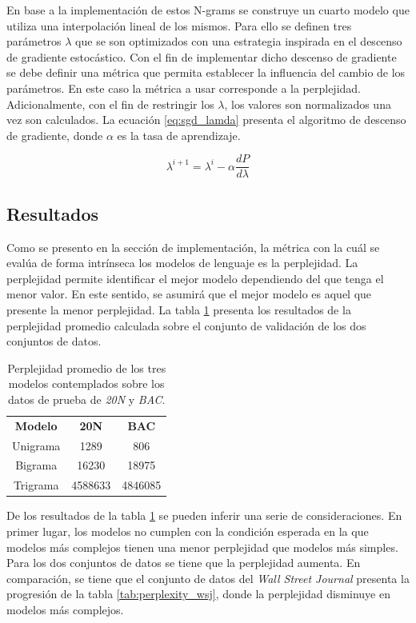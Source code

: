 En base a la implementación de estos N-grams se construye un cuarto modelo que utiliza una interpolación lineal de los mismos. Para ello se definen tres parámetros $\lambda$ que se son optimizados con una estrategia inspirada en el descenso de gradiente estocástico. Con el fin de implementar dicho descenso de gradiente se debe definir una métrica que permita establecer la influencia del cambio de los parámetros. En este caso la métrica a usar corresponde a la perplejidad. Adicionalmente, con el fin de restringir los $\lambda$, los valores son normalizados una vez son calculados. La ecuación \ref{eq:sgd_lamda} presenta el algoritmo de descenso de gradiente, donde $\alpha$ es la tasa de aprendizaje.

\begin{equation}
    \lambda^{i+1} = \lambda^{i} - \alpha \frac{dP}{d\lambda}
    \label{eq:sgd_lamda}
\end{equation}

\subsection{Resultados}
Como se presento en la sección de implementación, la métrica con la cuál se evalúa de forma intrínseca los modelos de lenguaje es la perplejidad. La perplejidad permite identificar el mejor modelo dependiendo del que tenga el menor valor. En este sentido, se asumirá que el mejor modelo es aquel que presente la menor perplejidad. La tabla \ref{tab:perplexity_laplace} presenta los resultados de la perplejidad promedio calculada sobre el conjunto de validación de los dos conjuntos de datos.

\begin{table}[h]
    \centering
    \begin{tabular}{|c|c|c|}
        \textbf{Modelo} & \textbf{20N} & \textbf{BAC} \\
        Unigrama  & 1289 & 806 \\
        Bigrama  & 16230 & 18975 \\
        Trigrama  & 4588633 & 4846085 \\
    \end{tabular}
    \caption{Perplejidad promedio de los tres modelos contemplados sobre los datos de prueba de \textit{20N} y \textit{BAC}.}
    \label{tab:perplexity_laplace}
\end{table}

De los resultados de la tabla \ref{tab:perplexity_laplace} se pueden inferir una serie de consideraciones. En primer lugar, los modelos no cumplen con la condición esperada en la que modelos más complejos tienen una menor perplejidad que modelos más simples. Para los dos conjuntos de datos se tiene que la perplejidad aumenta. En comparación, se tiene que el conjunto de datos del \textit{Wall Street Journal} presenta la progresión de la tabla \ref{tab:perplexity_wsj}, donde la perplejidad disminuye en modelos más complejos. 

